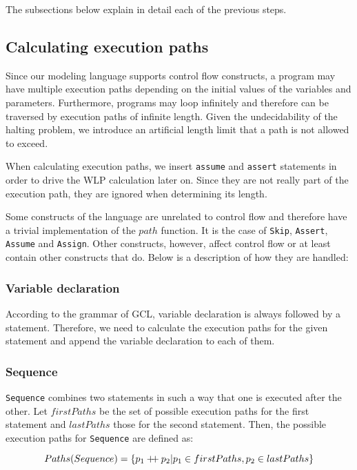 \documentclass[a4paper]{article}
\newcommand\mdoubleplus{\ensuremath{\mathbin{+\mkern-5mu+}}}
\begin{document}
The subsections below explain in detail each of the previous steps.

\subsection{Calculating execution paths}

Since our modeling language supports control flow constructs, a program may have
multiple execution paths depending on the initial values of the variables and
parameters. Furthermore, programs may loop infinitely and therefore can be traversed
by execution paths of infinite length. Given the undecidability of the halting
problem, we introduce an artificial length limit that a path is not allowed to exceed.

When calculating execution paths, we insert \texttt{assume} and \texttt{assert}
statements in order to drive the WLP calculation later on. Since they are not
really part of the execution path, they are ignored when determining its length.

Some constructs of the language are unrelated to control flow and therefore have
a trivial implementation of the $path$ function. It is the case of \texttt{Skip},
\texttt{Assert}, \texttt{Assume} and \texttt{Assign}. Other constructs, however,
affect control flow or at least contain other constructs that do. Below is a
description of how they are handled:

\subsubsection*{Variable declaration}

According to the grammar of GCL, variable declaration is always followed by a
statement. Therefore, we need to calculate the execution paths for the given
statement and append the variable declaration to each of them.

\subsubsection*{Sequence}

\texttt{Sequence} combines two statements in such a way that one is executed
after the other. Let $firstPaths$ be the set of possible execution paths for
the first statement and $lastPaths$ those for the second statement. Then, the
possible execution paths for \texttt{Sequence} are defined as:

\[ Paths(Sequence) = \{ p_1 \mdoubleplus p_2 | p_1 \in firstPaths, p_2 \in lastPaths\} \]
\end{document}

